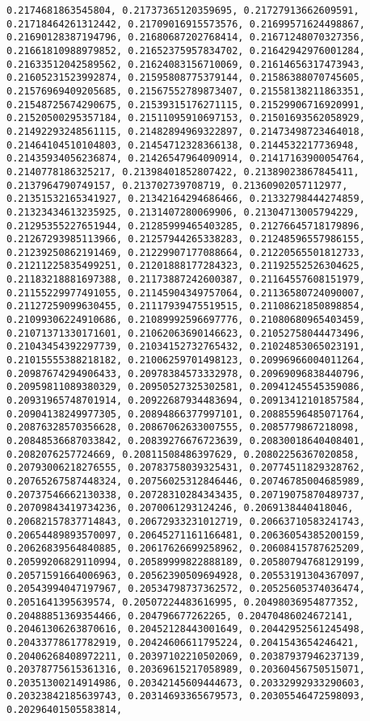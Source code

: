 \documentclass[11pt]{article}
\begin{document}
\begin{Verbatim}[commandchars=\\\{\}]
0.2174681863545804, 0.21737365120359695, 0.21727913662609591, 0.21718464261312442, 0.21709016915573576, 0.21699571624498867, 0.21690128387194796, 0.21680687202768414, 0.21671248070327356, 0.21661810988979852, 0.21652375957834702, 0.21642942976001284, 0.21633512042589562, 0.21624083156710069, 0.21614656317473943, 0.21605231523992874, 0.21595808775379144, 0.21586388070745605, 0.21576969409205685, 0.21567552789873407, 0.21558138211863351, 0.21548725674290675, 0.21539315176271115, 0.21529906716920991, 0.21520500295357184, 0.21511095910697153, 0.21501693562058929, 0.21492293248561115, 0.21482894969322897, 0.21473498723464018, 0.21464104510104803, 0.21454712328366138, 0.2144532217736948, 0.21435934056236874, 0.21426547964090914, 0.21417163900054764, 0.2140778186325217, 0.21398401852807422, 0.21389023867845411, 0.2137964790749157, 0.213702739708719, 0.21360902057112977, 0.21351532165341927, 0.21342164294686466, 0.21332798444274859, 0.21323434613235925, 0.2131407280069906, 0.21304713005794229, 0.21295355227651944, 0.21285999465403285, 0.21276645718179896, 0.21267293985113966, 0.21257944265338283, 0.21248596557986155, 0.21239250862191469, 0.21229907177088664, 0.21220565501812733, 0.21211225835499251, 0.21201888177284323, 0.21192552526304625, 0.21183218881697388, 0.21173887242600387, 0.21164557608151979, 0.21155229977491055, 0.21145904349757064, 0.21136580724090007, 0.21127259099630455, 0.21117939475519515, 0.21108621850898854, 0.21099306224910686, 0.21089992596697776, 0.21080680965403459, 0.21071371330171601, 0.21062063690146623, 0.21052758044473496, 0.21043454392297739, 0.21034152732765432, 0.21024853065023191, 0.21015555388218182, 0.21006259701498123, 0.20996966004011264, 0.20987674294906433, 0.20978384573332978, 0.20969096838440796, 0.20959811089380329, 0.20950527325302581, 0.20941245545359086, 0.20931965748701914, 0.20922687934483694, 0.20913412101857584, 0.20904138249977305, 0.20894866377997101, 0.20885596485071764, 0.20876328570356628, 0.20867062633007555, 0.2085779867218098, 0.20848536687033842, 0.20839276676723639, 0.20830018640408401, 0.2082076257724669, 0.20811508486397629, 0.20802256367020858, 0.20793006218276555, 0.20783758039325431, 0.20774511829328762, 0.20765267587448324, 0.20756025312846446, 0.20746785004685989, 0.20737546662130338, 0.20728310284343435, 0.20719075870489737, 0.20709843419734236, 0.2070061293124246, 0.2069138440418046, 0.20682157837714843, 0.20672933231012719, 0.20663710583241743, 0.20654489893570097, 0.20645271161166481, 0.20636054385200159, 0.20626839564840885, 0.20617626699258962, 0.20608415787625209, 0.20599206829110994, 0.20589999822888189, 0.20580794768129199, 0.20571591664006963, 0.20562390509694928, 0.20553191304367097, 0.20543994047197967, 0.20534798737362572, 0.20525605374036474, 0.2051641395639574, 0.20507224483616995, 0.20498036954877352, 0.20488851369354466, 0.204796677262265, 0.20470486024672141, 0.20461306263870616, 0.20452128443001649, 0.20442952561245498, 0.20433778617782919, 0.20424606611795224, 0.2041543654246421, 0.20406268408972211, 0.20397102210502069, 0.20387937946237139, 0.20378775615361316, 0.20369615217058989, 0.20360456750515071, 0.20351300214914986, 0.20342145609444673, 0.20332992933290603, 0.20323842185639743, 0.20314693365679573, 0.20305546472598093, 0.20296401505583814, 
\end{Verbatim}
\end{document}
